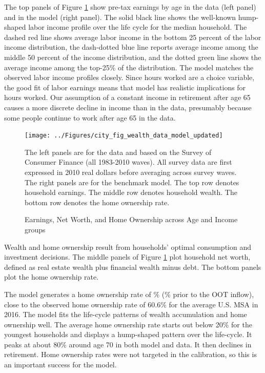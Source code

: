 \documentclass[letterpaper,12pt,dvipsnames,usenames]{article}
\theoremstyle{definition}
\begin{document}
\begin{spacing}{1.25}
The top panels of Figure \ref{Fig:WealthByAgeBaseline} show pre-tax earnings by age in the data (left panel) and in the model (right panel). The solid black line shows the well-known hump-shaped labor income profile over the life cycle for the median household. The dashed red line shows average labor income in the bottom 25 percent of the labor income distribution, the dash-dotted blue line reports average income among the middle 50 percent of the income distribution, and the dotted green line shows the average income among the top-25\% of the distribution. The model matches the observed labor income profiles closely. Since hours worked are a choice variable, the good fit of labor earnings means that model has realistic implications for hours worked. Our assumption of a constant income in retirement after age 65 causes a more discrete decline in income than in the data, presumably because some people continue to work after age 65 in the data.


\begin{figure}\caption{Earnings, Net Worth, and Home Ownership across Age and Income groups} \label{Fig:WealthByAgeBaseline}
\begin{center}
\texttt{[image: ../Figures/city\_fig\_wealth\_data\_model\_updated]}
\end{center}
\vspace{-1cm}
\begin{minipage}{\textwidth}\tiny
     The left panels are for the data and based on the Survey of Consumer Finance (all 1983-2010 waves). All survey data are first expressed in 2010 real dollars before averaging across survey waves. The right panels are for the benchmark model. The top row denotes household earnings. The middle row denotes household wealth. The bottom row denotes the home ownership rate.
    \end{minipage}
\end{figure}


Wealth and home ownership result from households' optimal consumption and investment decisions. The middle panels of Figure \ref{Fig:WealthByAgeBaseline} plot household net worth, defined as real estate wealth plus financial wealth minus debt. The bottom panels plot the home ownership rate.

The model generates a home ownership rate of {\AvgOwnRate}\% ({\AvgOwnRateB}\% prior to the OOT inflow), close  to the observed home ownership rate of 60.6\% for the average U.S. MSA in 2016.
The model fits the life-cycle patterns of  wealth accumulation and home ownership well. The average home ownership rate starts out below 20\% for the youngest households and displays a hump-shaped pattern over the life-cycle. It peaks at about 80\% around age 70 in both model and data. It then declines in retirement. Home ownership rates were not targeted in the calibration, so this is an important success for the model.


\end{spacing}
\end{document}
